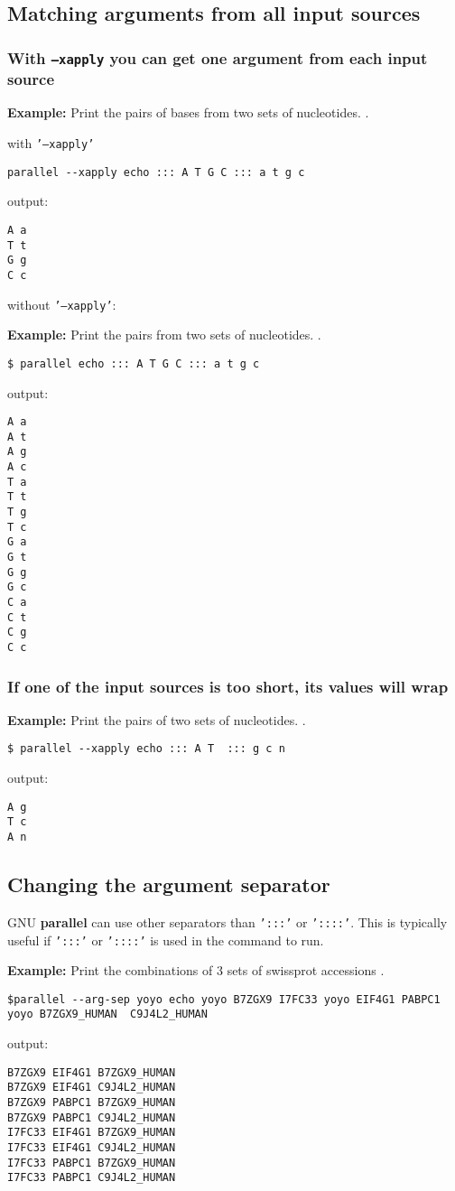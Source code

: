 \documentclass{article}
\newcommand{\example}[1]{
\textbf{Example: } {\color[rgb]{0,0,1} #1 } .
}
\newcommand{\cmdoption}[1]{\texttt{'#1'}}
\def\prl{\textbf{parallel}}
\begin{document}
\subsection{Matching arguments from all input sources}
\subsubsection{With \texttt{--xapply} you can get one argument from each input source}
\example{Print the pairs of bases from two sets of nucleotides. }
with \cmdoption{--xapply}
\begin{lstlisting}
parallel --xapply echo ::: A T G C ::: a t g c
\end{lstlisting}
output:
\begin{lstlisting}
A a
T t
G g
C c
\end{lstlisting}

without \cmdoption{--xapply}:
\example{Print the pairs from two sets of nucleotides. }
\begin{lstlisting}
$ parallel echo ::: A T G C ::: a t g c
\end{lstlisting}
output:
\begin{lstlisting}
A a
A t
A g
A c
T a
T t
T g
T c
G a
G t
G g
G c
C a
C t
C g
C c
\end{lstlisting}

\subsubsection{If one of the input sources is too short, its values will wrap}
\example{Print the pairs of two sets of nucleotides. }
\begin{lstlisting}
$ parallel --xapply echo ::: A T  ::: g c n
\end{lstlisting}
output:
\begin{lstlisting}
A g
T c
A n
\end{lstlisting}

\subsection{Changing the argument separator}
GNU \prl{} can use other separators than \cmdoption{:::} or \cmdoption{::::}. This is typically useful if \cmdoption{:::} or \cmdoption{::::} is used in the command to run.
\example{Print the combinations of 3 sets of swissprot accessions }
\begin{lstlisting}
$parallel --arg-sep yoyo echo yoyo B7ZGX9 I7FC33 yoyo EIF4G1 PABPC1 yoyo B7ZGX9_HUMAN  C9J4L2_HUMAN
\end{lstlisting}
output:
\begin{lstlisting}
B7ZGX9 EIF4G1 B7ZGX9_HUMAN
B7ZGX9 EIF4G1 C9J4L2_HUMAN
B7ZGX9 PABPC1 B7ZGX9_HUMAN
B7ZGX9 PABPC1 C9J4L2_HUMAN
I7FC33 EIF4G1 B7ZGX9_HUMAN
I7FC33 EIF4G1 C9J4L2_HUMAN
I7FC33 PABPC1 B7ZGX9_HUMAN
I7FC33 PABPC1 C9J4L2_HUMAN
\end{lstlisting}
\end{document}
